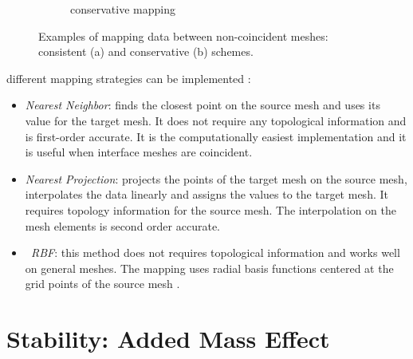 \begin{figure}[htbp!]
\begin{subfigure}{.8\textwidth}
		\caption{conservative mapping}
		\label{fig:conservative}
	\end{subfigure}
	\caption{Examples of mapping data between non-coincident meshes: consistent (a) and conservative (b) schemes.}
	\label{fig:mapping}
\end{figure}


different mapping strategies can be implemented \cite{bungartz2016precice}:

\begin{itemize}
	\item \textit{Nearest Neighbor}: finds the closest point on the source mesh and uses its value for the target mesh. It does not require any topological information and is first-order accurate. It is the computationally easiest implementation and it is useful when interface meshes are coincident.
	\item \textit{Nearest Projection}: projects the points of the target mesh on the source mesh, interpolates the data linearly and assigns the values to the target mesh. It requires topology information for the source mesh. The interpolation on the mesh elements is second order accurate.
	\item \textit{~\ac{RBF}}: this method does not requires topological information and works well on general meshes. The mapping uses radial basis functions centered at the grid points of the source mesh \cite{lindner2017radial}.
\end{itemize}


\section{Stability: Added Mass Effect}
\label{sec:added-mass}


\cite{van2009added}
\cite{causin2005added}
\cite{forster2006artificial}
\cite{degroote2008stability}

